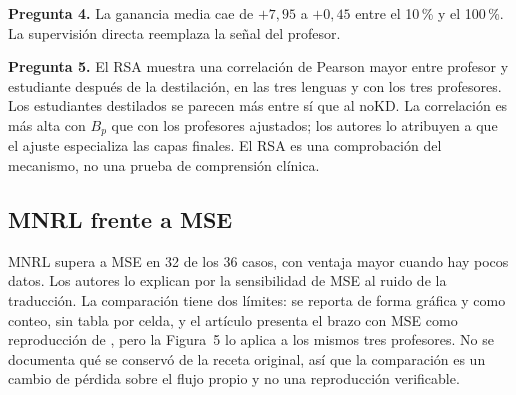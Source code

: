 \textbf{Pregunta 4.} La ganancia media cae de $+7{,}95$ a $+0{,}45$ entre el 10\,\% y el 100\,\%. La supervisión directa reemplaza la señal del profesor.

\textbf{Pregunta 5.} El RSA muestra una correlación de Pearson mayor entre profesor y estudiante después de la destilación, en las tres lenguas y con los tres profesores. Los estudiantes destilados se parecen más entre sí que al noKD. La correlación es más alta con $B_p$ que con los profesores ajustados; los autores lo atribuyen a que el ajuste especializa las capas finales. El RSA es una comprobación del mecanismo, no una prueba de comprensión clínica.

\subsection{MNRL frente a MSE}

MNRL supera a MSE en 32 de los 36 casos, con ventaja mayor cuando hay pocos datos. Los autores lo explican por la sensibilidad de MSE al ruido de la traducción. La comparación tiene dos límites: se reporta de forma gráfica y como conteo, sin tabla por celda, y el artículo presenta el brazo con MSE como reproducción de \cite{reimers2020}, pero la Figura~5 lo aplica a los mismos tres profesores. No se documenta qué se conservó de la receta original, así que la comparación es un cambio de pérdida sobre el flujo propio y no una reproducción verificable.

